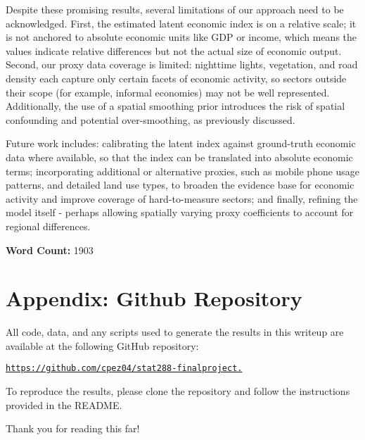 \documentclass[12pt]{article}
\begin{document}
Despite these promising results, several limitations of our approach need to be acknowledged. First, the estimated latent economic index is on a relative scale; it is not anchored to absolute economic units like GDP or income, which means the values indicate relative differences but not the actual size of economic output. Second, our proxy data coverage is limited: nighttime lights, vegetation, and road density each capture only certain facets of economic activity, so sectors outside their scope (for example, informal economies) may not be well represented. Additionally, the use of a spatial smoothing prior introduces the risk of spatial confounding and potential over-smoothing, as previously discussed.

Future work includes: calibrating the latent index against ground-truth economic data where available, so that the index can be translated into absolute economic terms; incorporating additional or alternative proxies, such as mobile phone usage patterns, and detailed land use types, to broaden the evidence base for economic activity and improve coverage of hard-to-measure sectors; and finally, refining the model itself - perhaps allowing spatially varying proxy coefficients to account for regional differences. 

\noindent \textbf{Word Count:} 1903

\newpage


\printbibliography

\section*{Appendix: Github Repository}
\label{appendix:code}

All code, data, and any scripts used to generate the results in this writeup are available at the following GitHub repository:

\begin{center}
\href{https://github.com/cpez04/stat288-finalproject}{\texttt{https://github.com/cpez04/stat288-finalproject.}}
\end{center}

To reproduce the results, please clone the repository and follow the instructions provided in the README. 

Thank you for reading this far!
\end{document}
